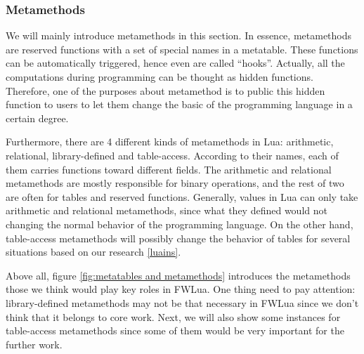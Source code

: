 \documentclass{article}
\begin{document}
\subsubsection{Metamethods}
We will mainly introduce metamethods in this section. In essence, metamethods are reserved functions with a set of special names in a metatable. These functions can be automatically triggered, hence even are called ``hooks''. Actually, all the computations during programming can be thought as hidden functions. Therefore, one of the purposes about metamethod is to public this hidden function to users to let them change the basic of the programming language in a certain degree.

Furthermore, there are 4 different kinds of metamethods in Lua: arithmetic, relational, library-defined and table-access. According to their names, each of them carries functions toward different fields. The arithmetic and relational metamethods are mostly responsible for binary operations, and the rest of two are often for tables and reserved functions. Generally, values in Lua can only take arithmetic and relational metamethods, since what they defined would not changing the normal behavior of the programming language. On the other hand, table-access metamethods will possibly change the behavior of tables for several situations based on our research \ref{luains}.

Above all, figure \ref{fig:metatables and metamethods} introduces the metamethods those we think would play key roles in FWLua. One thing need to pay attention: library-defined metamethods may not be that necessary in FWLua since we don't think that it belongs to core work. Next, we will also show some instances for table-access metamethods since some of them would be very important for the further work.
\end{document}
